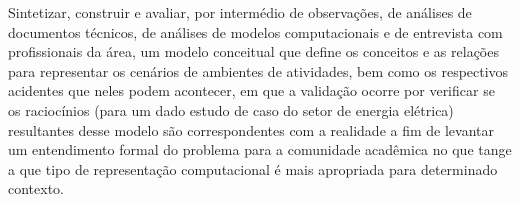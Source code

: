 Sintetizar, construir e avaliar, por intermédio de observações, de análises de documentos técnicos, de análises de modelos computacionais e de entrevista com profissionais da área, um modelo conceitual que define os conceitos e as relações para representar os cenários de ambientes de atividades, bem como os respectivos acidentes que neles podem acontecer, em que a validação ocorre por verificar se os raciocínios (para um dado estudo de caso do setor de energia elétrica) resultantes desse modelo são correspondentes com a realidade a fim de levantar um entendimento formal do problema para a comunidade acadêmica no que tange a que tipo de representação computacional é mais apropriada para determinado contexto. 